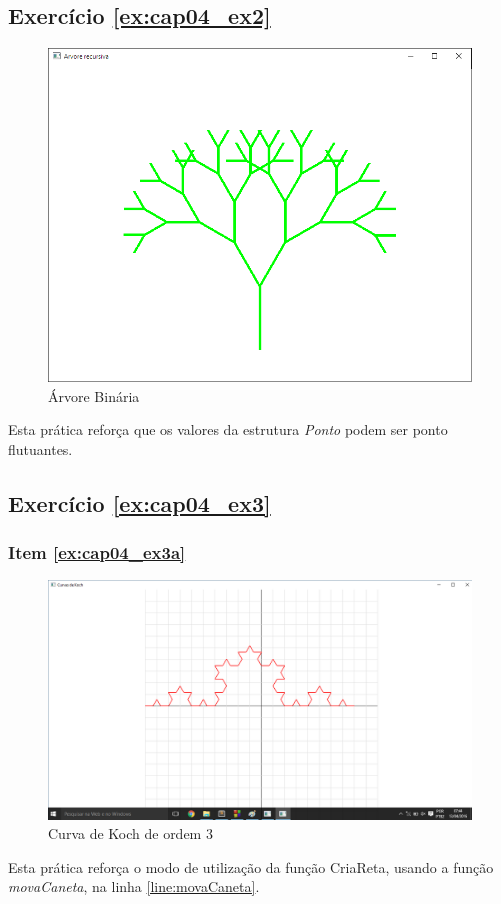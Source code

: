 \subsection*{Exercício \ref{ex:cap04_ex2} }
\begin{figure}[ht]
  \centerline{\includegraphics[width=.5\textwidth]{img/cap4_ex17.png}}
  \caption{Árvore Binária}
  \label{fig:cap04_ex2}
\end{figure}
Esta prática reforça que os valores da estrutura \emph{Ponto} podem ser ponto flutuantes.


\subsection*{Exercício \ref{ex:cap04_ex3} }
\subsubsection*{Item \ref{ex:cap04_ex3a}}
\begin{figure}[ht]
  \centerline{\includegraphics[width=.5\textwidth]{img/cap4_ex14.png}}
  \caption{Curva de Koch de ordem 3}
  \label{fig:cap04_ex3a}
\end{figure}
Esta prática reforça o modo de utilização da função CriaReta, usando a função \emph{movaCaneta}, na linha \ref{line:movaCaneta}.


